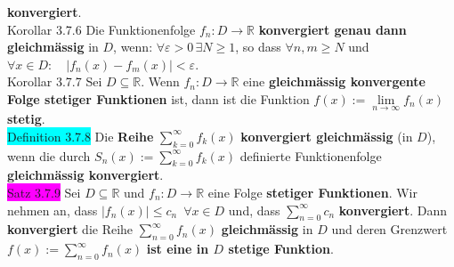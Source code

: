 \documentclass[landscape, 10pt]{article}
\newcommand{\R}{\mathbb{R}}
\begin{document}
\begin{multicols}{3}
                     \textbf{konvergiert}.\\
              \colorbox{BurntOrange}{Korollar 3.7.6} 
                     Die Funktionenfolge 
                     \textcolor{NavyBlue}{$f_n:D\longrightarrow\R$}
                     \textbf{konvergiert genau dann gleichmässig} in $D$, wenn: 
                     \textcolor{NavyBlue}{
                     $\forall\varepsilon>0\,\exists N\geqslant1$}, 
                     so dass 
                     \textcolor{NavyBlue}{$\forall n,m\geqslant N$} und 
                     \textcolor{NavyBlue}{
                     $\forall x\in D:\quad |f_n(x)-f_m(x)|<\varepsilon$}.\\
              \colorbox{BurntOrange}{Korollar 3.7.7} 
                     Sei \textcolor{NavyBlue}{$D\subseteq\R$}. Wenn 
                     \textcolor{NavyBlue}{$f_n:D\longrightarrow\R$} 
                     eine \textbf{gleichmässig konvergente Folge 
                     stetiger Funktionen} ist, 
                     dann ist die Funktion \textcolor{NavyBlue}{
                     $f(x):=\lim\limits_{n\to\infty}f_n(x)$} \textbf{stetig}.\\
              \colorbox{cyan}{Definition 3.7.8} 
                     Die \textbf{Reihe}
                     \textcolor{NavyBlue}{$\sum_{k=0}^\infty f_k(x)$}
                     \textbf{konvergiert gleichmässig} (in $D$), wenn die durch 
                     \textcolor{NavyBlue}{$S_n(x):=\sum_{k=0}^\infty f_k(x)$} 
                     definierte Funktionenfolge 
                     \textbf{gleichmässig konvergiert}.\\
              \colorbox{magenta}{Satz 3.7.9} 
                     Sei \textcolor{NavyBlue}{$D\subseteq\R$} und 
                     \textcolor{NavyBlue}{$f_n:D\longrightarrow\R$} 
                     eine Folge \textbf{stetiger Funktionen}. 
                     Wir nehmen an, dass 
                     \textcolor{NavyBlue}{
                     $|f_n(x)|\leqslant c_n\enspace\forall x\in D$}
                     und, dass \textcolor{NavyBlue}{$\sum_{n=0}^\infty c_n$} 
                     \textbf{konvergiert}. 
                     Dann \textbf{konvergiert} die Reihe 
                     \textcolor{NavyBlue}{$\sum_{n=0}^\infty f_n(x)$} 
                     \textbf{gleichmässig} 
                     in $D$ und deren 
                     Grenzwert 
                     \textcolor{NavyBlue}{$f(x):=\sum_{n=0}^\infty f_n(x)$} 
                     \textbf{ist eine in $D$ stetige Funktion}.\\

\end{multicols}
\end{document}
